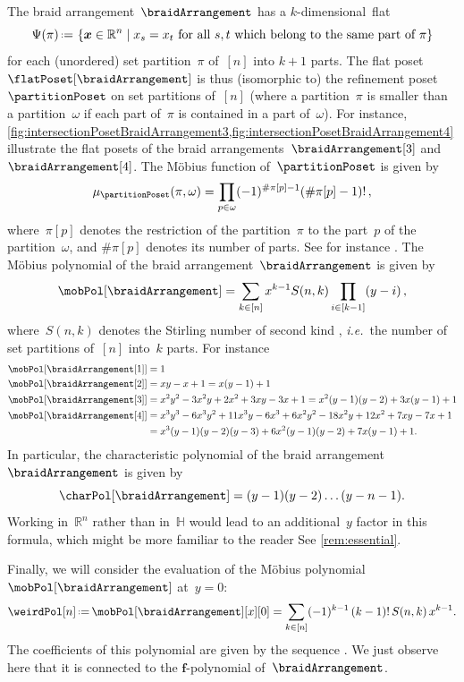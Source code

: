 \documentclass{amsart}
\newcommand{\BDO}[1]{\todo[color=green!30]{\rm #1 \\ \hfill --- B.}}
\theoremstyle{definition}
\newcommand{\R}{\mathbb{R}} %
\renewcommand{\b}[1]{{\boldsymbol{#1}}} %
\newcommand{\set}[2]{\left\{ #1 \;\middle|\; #2 \right\}} %
\newcommand{\eqdef}{\mbox{\,\raisebox{0.2ex}{\scriptsize\ensuremath{\mathrm:}}\ensuremath{=}\,}} %
\newcommand{\ie}{\textit{i.e.}~} %
\newcommand{\OEIS}[1]{\cite[{\rm \href{http://oeis.org/#1}{\texttt{#1}}}]{OEIS}}
\renewcommand{\b}[1]{\boldsymbol{#1}} %
\newcommand{\HH}{\mathbb{H}} %
\begin{document}
The braid arrangement~$\braidArrangement$ has a $k$-dimensional~flat
\[
\Psi(\pi) \eqdef \set{\b{x} \in \R^n}{x_s = x_t \text{ for all  $s, t$ which belong to the same part of~$\pi$}}
\]
for each (unordered) set partition~$\pi$ of~$[n]$ into $k+1$ parts.
The flat poset~$\flatPoset[\braidArrangement]$ is thus (isomorphic to) the refinement poset~$\partitionPoset$ \BDO{$\Pi_n$ ?} on set partitions of~$[n]$ (where a partition~$\pi$ is smaller than a partition~$\omega$ if each part of~$\pi$ is contained in a part of~$\omega$).
For instance, \cref{fig:intersectionPosetBraidArrangement3,fig:intersectionPosetBraidArrangement4} illustrate the flat posets of the braid arrangements~$\braidArrangement[3]$ and~$\braidArrangement[4]$.
The M\"obius function of~$\partitionPoset$ is given by
\[
\mu_{\partitionPoset}(\pi, \omega) = \prod_{p \in \omega} (-1)^{\#\pi[p]-1}(\#\pi[p]-1)! \, ,
\]
where~$\pi[p]$ denotes the restriction of the partition~$\pi$ to the part~$p$ of the partition~$\omega$, and $\#\pi[p]$ denotes its number of parts.
See for instance \cite{Birkhoff, Rota}.
The M\"obius polynomial of the braid arrangement~$\braidArrangement$ is given by
\[
\mobPol[\braidArrangement] = \sum_{k \in [n]} x^{k-1} S(n,k) \prod_{i \in [k-1]} (y-i) \, ,
\]
where~$S(n,k)$ denotes the Stirling number of second kind \OEIS{A008277}, \ie the number of set partitions of~$[n]$ into~$k$ parts.
For instance
\begin{align*}
\mobPol[{\braidArrangement[1]}] & = 1 \\
\mobPol[{\braidArrangement[2]}] & = x y - x + 1 = x (y - 1) + 1 \\
\mobPol[{\braidArrangement[3]}] & = x^2 y^2 - 3 x^2 y + 2 x^2 + 3 x y - 3 x + 1 = x^2 (y - 1) (y - 2) + 3 x (y - 1) + 1\\
\mobPol[{\braidArrangement[4]}] & = x^3 y^3 - 6 x^3 y^2 + 11 x^3 y - 6 x^3 + 6 x^2 y^2 - 18 x^2 y + 12 x^2 + 7 x y - 7 x + 1 \\
& = x^3 (y - 1) (y - 2) (y - 3) + 6 x^2 (y - 1) (y - 2) + 7 x (y - 1) + 1.
\end{align*}
In particular, the characteristic polynomial of the braid arrangement~$\braidArrangement$ is given by
\[
\charPol[\braidArrangement] = (y-1) (y-2) \dots (y-n-1).
\]
Working in~$\R^n$ rather than in~$\HH$ would lead to an additional~$y$ factor in this formula, which might be more familiar to the reader
See \cref{rem:essential}.

Finally, we will consider the evaluation of the M\"obius polynomial~$\mobPol[\braidArrangement]$ at~$y = 0$:
\[
\weirdPol[n] \eqdef \mobPol[\braidArrangement][x][0] = \sum_{k \in [n]} (-1)^{k-1} \, (k-1)! \, S(n,k) \, x^{k-1}.
\] 
The coefficients of this polynomial are given by the sequence \OEIS{A028246}.
We just observe here that it is connected to the $\b{f}$-polynomial of~$\braidArrangement$.
\end{document}
